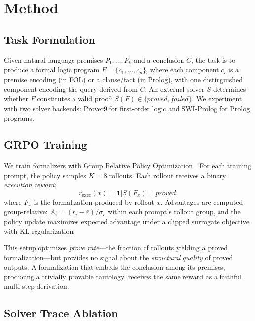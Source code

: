 
\section{Method}
\label{sec:method}

\subsection{Task Formulation}
\label{sec:task}

Given natural language premises $P_1, \ldots, P_k$ and a conclusion $C$, the task is to produce a formal logic program $F = \{c_1, \ldots, c_n\}$, where each component $c_i$ is a premise encoding (in FOL) or a clause/fact (in Prolog), with one distinguished component encoding the query derived from $C$.
An external solver $S$ determines whether $F$ constitutes a valid proof:
$S(F) \in \{\textit{proved}, \textit{failed}\}$.
We experiment with two solver backends: Prover9 for first-order logic and SWI-Prolog for Prolog programs.

\subsection{GRPO Training}
\label{sec:grpo}

We train formalizers with Group Relative Policy Optimization \citep[GRPO;][]{deepseekmath}.
For each training prompt, the policy samples $K{=}8$ rollouts.
Each rollout receives a binary \emph{execution reward}:
\begin{equation}
  r_{\text{exec}}(x) = \mathbf{1}\bigl[S(F_x) = \textit{proved}\bigr]
  \label{eq:rexec}
\end{equation}
where $F_x$ is the formalization produced by rollout $x$.
Advantages are computed group-relative: $A_i = (r_i - \bar{r}) / \sigma_r$ within each prompt's rollout group, and the policy update maximizes expected advantage under a clipped surrogate objective with KL regularization.

This setup optimizes \emph{prove rate}---the fraction of rollouts yielding a proved formalization---but provides no signal about the \emph{structural quality} of proved outputs.
A formalization that embeds the conclusion among its premises, producing a trivially provable tautology, receives the same reward as a faithful multi-step derivation.

\subsection{Solver Trace Ablation}
\label{sec:sta}

